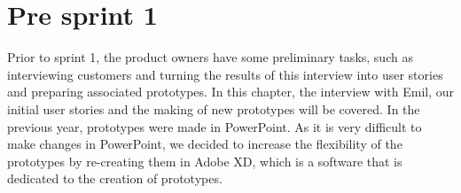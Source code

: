 \chapter{Pre sprint 1}
Prior to sprint 1, the product owners have some preliminary tasks, such as interviewing customers and turning the results of this interview into user stories and preparing associated prototypes.
In this chapter, the interview with Emil, our initial user stories and the making of new prototypes will be covered.
In the previous year, prototypes were made in PowerPoint.
As it is very difficult to make changes in PowerPoint, we decided to increase the flexibility of the prototypes by re-creating them in Adobe XD, which is a software that is dedicated to the creation of prototypes.
